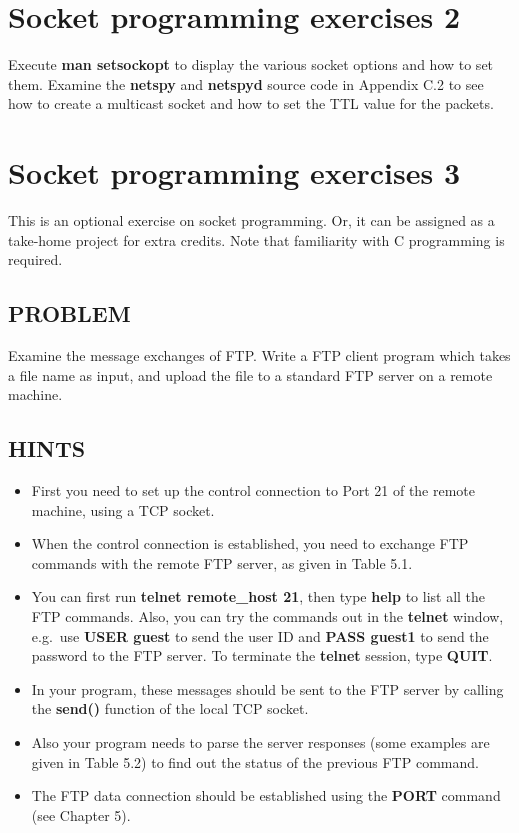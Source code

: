 \documentclass[10pt,a4paper]{article}
\numberwithin{equation}{section}
\numberwithin{figure}{section}
\numberwithin{table}{section}
\begin{document}
    \section*{Socket programming exercises 2}
    Execute \textbf{man setsockopt} to display the various socket options and how to set them.
    Examine the \textbf{netspy} and \textbf{netspyd} source code in Appendix C.2 to see how to create a multicast socket and how to set the TTL value for the packets.

    \section*{Socket programming exercises 3}
    This is an optional exercise on socket programming.
    Or, it can be assigned as a take-home project for extra credits.
    Note that familiarity with C programming is required.
    \subsection*{PROBLEM}
    Examine the message exchanges of FTP. Write a FTP client program which takes a file name as input, and upload the file to a standard FTP server on a remote machine.
    \subsection*{HINTS}
    \begin{itemize}
        \item First you need to set up the control connection to Port 21 of the remote machine, using a TCP socket.
        \item When the control connection is established, you need to exchange FTP commands with the remote FTP server, as given in Table 5.1.
        \item You can first run \textbf{telnet remote\_host 21}, then type \textbf{help} to list all the FTP commands.
        Also, you can try the commands out in the \textbf{telnet} window, e.g.\  use \textbf{USER guest} to send the user ID and \textbf{PASS guest1} to send the password to the FTP server.
        To terminate the \textbf{telnet} session, type \textbf{QUIT}.
        \item In your program, these messages should be sent to the FTP server by calling the \textbf{send()} function of the local TCP socket.
        \item Also your program needs to parse the server responses (some examples are given in Table 5.2) to find out the status of the previous FTP command.
        \item The FTP data connection should be established using the \textbf{PORT} command (see Chapter 5).
    \end{itemize}
\fi
\end{document}
